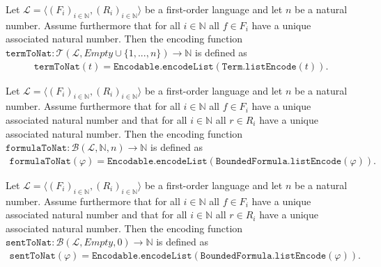 \begin{definition}\label{def:S-Term-Enc}
  \leanok
    Let $\mathcal{L} = \langle (F_i)_{i \in \mathbb{N}}, (R_i)_{i \in \mathbb{N}} \rangle$ be a first-order language and let $n$ be a natural number. Assume furthermore that for all $i \in \mathbb{N}$ all $f \in F_i$ have a unique associated natural number. Then the encoding function $\texttt{termToNat} : \mathcal{T}(\mathcal{L},Empty \cup \{1,...,n\}) \to \mathbb{N}$ is defined as 
    \begin{align*}  
        \texttt{termToNat}(t) = \texttt{Encodable.encodeList}(\texttt{Term.listEncode}(t)).
    \end{align*}
\end{definition}

\begin{definition}\label{def:FV-Formula-to-N}
  \leanok
    Let $\mathcal{L} = \langle (F_i)_{i \in \mathbb{N}}, (R_i)_{i \in \mathbb{N}} \rangle$ be a first-order language and let $n$ be a natural number. Assume furthermore that for all $i \in \mathbb{N}$ all $f \in F_i$ have a unique associated natural number and that for all $i \in \mathbb{N}$ all $r \in R_i$ have a unique associated natural number. Then the encoding function $\texttt{formulaToNat} : \mathcal{B}(\mathcal{L},\mathbb{N},n) \to \mathbb{N}$ is defined as 
    \begin{align*}
        \texttt{formulaToNat}(\varphi) = \texttt{Encodable.encodeList}(\texttt{BoundedFormula.listEncode}(\varphi)).
    \end{align*}
\end{definition}

\begin{definition}\label{def:S-To-N}
  \leanok
    Let $\mathcal{L} = \langle (F_i)_{i \in \mathbb{N}}, (R_i)_{i \in \mathbb{N}} \rangle$ be a first-order language and let $n$ be a natural number. Assume furthermore that for all $i \in \mathbb{N}$ all $f \in F_i$ have a unique associated natural number and that for all $i \in \mathbb{N}$ all $r \in R_i$ have a unique associated natural number. Then the encoding function $\texttt{sentToNat} : \mathcal{B}(\mathcal{L},Empty,0) \to \mathbb{N}$ is defined as 
    \begin{align*}
        \texttt{sentToNat}(\varphi) = \texttt{Encodable.encodeList}(\texttt{BoundedFormula.listEncode}(\varphi)).
    \end{align*}
\end{definition}

